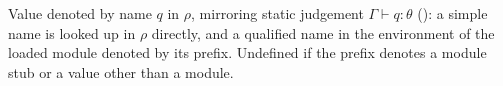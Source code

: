 Value denoted by name $q$ in $\rho$, mirroring static judgement $\Gamma \vdash q : \theta$
(): a simple name is looked up in $\rho$ directly, and a qualified name in the
environment of the loaded module denoted by its prefix. Undefined if the prefix denotes a module stub or a
value other than a module.
